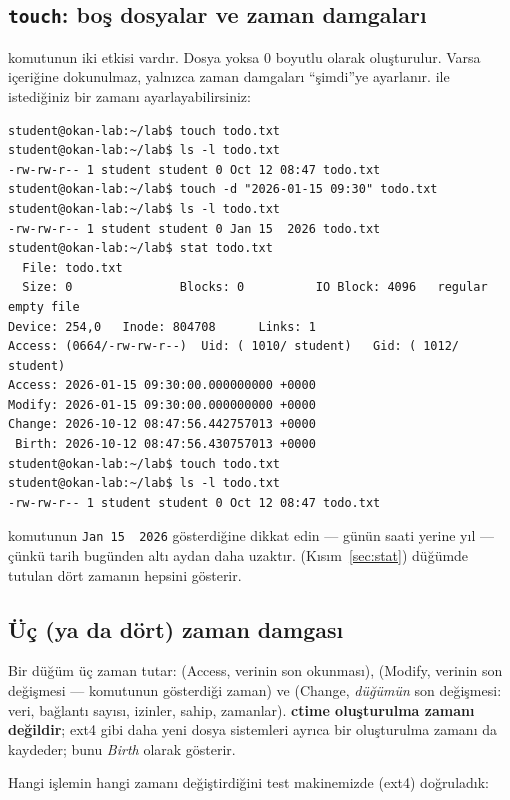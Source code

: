 \subsection{\texttt{touch}: boş dosyalar ve zaman damgaları}

 komutunun iki etkisi vardır. Dosya yoksa $0$ boyutlu olarak oluşturulur. Varsa içeriğine dokunulmaz, yalnızca zaman damgaları ``şimdi''ye ayarlanır.  ile istediğiniz bir zamanı ayarlayabilirsiniz:

\begin{lstlisting}[style=term]
student@okan-lab:~/lab$ touch todo.txt
student@okan-lab:~/lab$ ls -l todo.txt
-rw-rw-r-- 1 student student 0 Oct 12 08:47 todo.txt
student@okan-lab:~/lab$ touch -d "2026-01-15 09:30" todo.txt
student@okan-lab:~/lab$ ls -l todo.txt
-rw-rw-r-- 1 student student 0 Jan 15  2026 todo.txt
student@okan-lab:~/lab$ stat todo.txt
  File: todo.txt
  Size: 0               Blocks: 0          IO Block: 4096   regular empty file
Device: 254,0   Inode: 804708      Links: 1
Access: (0664/-rw-rw-r--)  Uid: ( 1010/ student)   Gid: ( 1012/ student)
Access: 2026-01-15 09:30:00.000000000 +0000
Modify: 2026-01-15 09:30:00.000000000 +0000
Change: 2026-10-12 08:47:56.442757013 +0000
 Birth: 2026-10-12 08:47:56.430757013 +0000
student@okan-lab:~/lab$ touch todo.txt
student@okan-lab:~/lab$ ls -l todo.txt
-rw-rw-r-- 1 student student 0 Oct 12 08:47 todo.txt
\end{lstlisting}

 komutunun \texttt{Jan 15\ \ 2026} gösterdiğine dikkat edin --- günün saati yerine yıl --- çünkü tarih bugünden altı aydan daha uzaktır.  (Kısım~\ref{sec:stat}) düğümde tutulan dört zamanın hepsini gösterir.

\subsection{Üç (ya da dört) zaman damgası}

Bir düğüm üç zaman tutar:  (Access, verinin son okunması),  (Modify, verinin son değişmesi ---  komutunun gösterdiği zaman) ve  (Change, \emph{düğümün} son değişmesi: veri, bağlantı sayısı, izinler, sahip, zamanlar). \textbf{ctime oluşturulma zamanı değildir}; ext4 gibi daha yeni dosya sistemleri ayrıca bir oluşturulma zamanı da kaydeder;  bunu \emph{Birth} olarak gösterir.

Hangi işlemin hangi zamanı değiştirdiğini test makinemizde (ext4) doğruladık:


